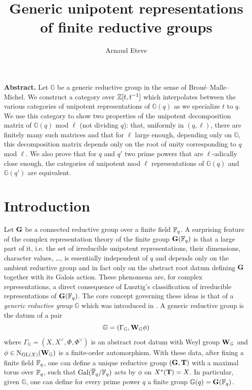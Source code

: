 \documentclass[a4paper, 10pt, oneside, reqno]{amsart}
\title{Generic unipotent representations of finite reductive groups}
\author{Arnaud Eteve}
\theoremstyle{plain}
\theoremstyle{definition}
\theoremstyle{remark}
\newcommand{\Gbb}{\mathbb{G}}
\begin{document}
\maketitle

\noindent\textbf{Abstract.} Let $\Gbb$ be a generic reductive group in the sense of Broué--Malle--Michel. We construct a category over $\mathbb{Z}[t,t^{-1}]$ which interpolates between the various categories of unipotent representations of $\Gbb(q)$ as we specialize $t$ to $q$. We use this category to show two properties of the unipotent decomposition matrix of $\Gbb(q)$ mod $\ell$ (not dividing $q$): that, uniformly in $(q,\ell)$, there are finitely many such matrices and that for $\ell$ large enough, depending only on $\Gbb$, this decomposition matrix depends only on the root of unity corresponding to $q$ mod $\ell$. We also prove that for $q$ and $q'$ two prime powers that are $\ell$-adically close enough, the categories of unipotent mod $\ell$ representations of $\Gbb(q)$ and $\Gbb(q')$ are equivalent. 


\tableofcontents

\section{Introduction}

Let $\mathbf{G}$ be a connected reductive group over a finite field $\mathbb{F}_q$. A surprising feature of the complex representation theory of the finite group $\mathbf{G}(\mathbb{F}_q)$ is that a large part of it, i.e. the set of irreducible unipotent representations, their dimensions, character values, \dots, is essentially independent of $q$ and depends only on the ambient reductive group and in fact only on the abstract root datum defining $\mathbf{G}$ together with its Galois action. These phenomena are, for complex representations, a direct consequence of Lusztig's classification \cite[Theorem 4.23]{LusztigBook} of irreducible representations of $\mathbf{G}(\mathbb{F}_q)$. The core concept governing these ideas is that of a \emph{generic reductive group} $\Gbb$ which was introduced in \cite{BroueMalle}. A generic reductive group is the datum of a pair 
$$\Gbb = (\Gamma_{\Gbb}, \Wbf_{\Gbb}\phi)$$
where $\Gamma_{\Gbb} = (X, X^{\vee}, \Phi, \Phi^{\vee})$ is an abstract root datum with Weyl group $\Wbf_{\Gbb}$ and $\phi \in \mathrm{N}_{\GL(X)}(\Wbf_{\Gbb})$ is a finite-order automorphism. With these data, after fixing a finite field $\mathbb{F}_q$, one can define a unique reductive group $(\mathbf{G}, \mathbf{T})$ with a maximal torus over $\mathbb{F}_q$, such that $\mathrm{Gal}(\overline{\mathbb{F}}_q/\mathbb{F}_q)$ acts by $\phi$ on $X^*(\mathbf{T}) = X$. In particular, given $\Gbb$, one can define for every prime power $q$ a finite group $\Gbb(q) = \Gbf(\Fq)$. 
\end{document}

